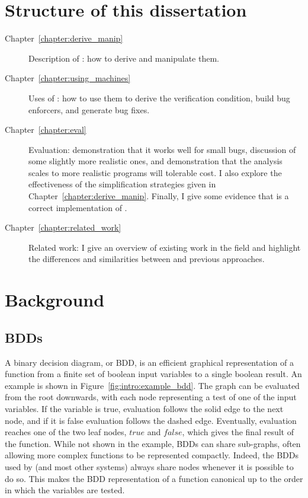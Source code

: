 
\section{Structure of this dissertation}

\begin{description}
\item[Chapter~\ref{chapter:derive_manip}] Description of
  \StateMachines: how to derive and manipulate them.
\item[Chapter~\ref{chapter:using_machines}] Uses of \StateMachines:
  how to use them to derive the verification condition, build bug
  enforcers, and generate bug fixes.
\item[Chapter~\ref{chapter:eval}] Evaluation: demonstration that it
  works well for small bugs, discussion of some slightly more
  realistic ones, and demonstration that the analysis scales to more
  realistic programs will tolerable cost.  I also explore the
  effectiveness of the {\StateMachine} simplification strategies given
  in Chapter~\ref{chapter:derive_manip}.  Finally, I give some
  evidence that {\implementation} is a correct implementation of
  {\technique}.
\item[Chapter~\ref{chapter:related_work}] Related work: I give an
  overview of existing work in the field and highlight the differences
  and similarities between {\technique} and previous approaches.
\end{description}

\section{Background}
\subsection{BDDs}

A binary decision diagram, or BDD, is an efficient graphical
representation of a function from a finite set of boolean input
variables to a single boolean result.  An example is shown in
Figure~\ref{fig:intro:example_bdd}.  The graph can be evaluated from
the root downwards, with each node representing a test of one of the
input variables.  If the variable is true, evaluation follows the
solid edge to the next node, and if it is false evaluation follows the
dashed edge.  Eventually, evaluation reaches one of the two leaf
nodes, $\mathit{true}$ and $\mathit{false}$, which gives the final
result of the function.    While not shown
in the example, BDDs can share sub-graphs, often allowing more complex
functions to be represented compactly.  Indeed, the BDDs used by
{\implementation} (and most other systems) always share nodes whenever
it is possible to do so.  This makes the BDD representation of a
function canonical up to the order in which the variables are
tested.

